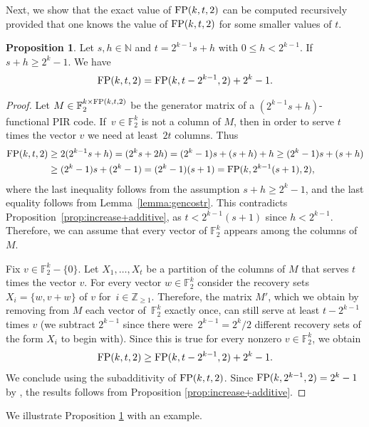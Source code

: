 \documentclass[11pt,a4paper]{article}
\theoremstyle{definition}
\newtheorem{proposition}[theorem]{Proposition}
\newcommand{\N}{\mathbb N}
\newcommand{\Z}{\mathbb Z}
\newcommand{\F}{\mathbb F}
\newcommand{\fp}{\textnormal{FP}}
\begin{document}
Next, we show that the exact value of $\fp(k,t,2)$ can be computed recursively provided that one knows the value of $\fp(k,t,2)$ for some smaller values of $t$.

\begin{proposition}
\label{prop:recursion}
Let $s,h \in \N$ and $t=2^{k-1}s+h$ with $0\leq h< 2^{k-1}$. If $s+h\geq 2^{k}-1$. We have
\begin{equation*}
    \fp(k,t,2)= \fp(k,t-2^{k-1},2)+2^k-1. 
\end{equation*}
\end{proposition}
\begin{proof}
Let $M\in\F_2^{k\times\fp(k,t,2)}$ be the generator matrix of a $(2^{k-1}s+h)$-functional PIR code. If~$v\in\F_2^k$ is not a column of $M$, then in order to serve $t$ times the vector $v$ we  need at least~$2t$ columns. Thus
\begin{align*}
    \fp(k,t,2)&\geq 2(2^{k-1}s+h)= (2^ks+2h)=(2^k-1)s+(s+h) + h \geq (2^k-1)s+(s+h) \\
    &\ge (2^k-1)s+(2^k-1) = (2^k-1)(s+1) =
   \fp(k,2^{k-1}(s+1),2),
\end{align*}
where the last inequality follows from the assumption $s+h\geq 2^{k}-1$, and the last equality follows from Lemma~\ref{lemma:gencostr}. This contradicts Proposition~\ref{prop:increase+additive}, as $t<2^{k-1}(s+1)$ since $h<2^{k-1}$. Therefore, we can assume that every vector of $\F_2^k$ appears among the columns of $M$. 

Fix $v\in\F_2^k - \{0\}$. Let $X_1,\dots,X_t$ be a partition of the columns of $M$ that serves $t$ times the vector $v$. For every vector $w\in\F_2^k$ consider the recovery sets $X_i=\{w,v+w\}$ of $v$ for~$i \in \Z_{\ge 1}.$ Therefore, the matrix $M'$, which we obtain by removing from $M$ each vector of~$\F_2^k$ exactly once,  can still serve at least $t-2^{k-1}$ times $v$ (we subtract $2^{k-1}$ since there were~$2^{k-1} = 2^k/2$ different recovery sets of the form $X_i$ to begin with). Since this is true for every nonzero $v\in\F_2^k$, we obtain
\begin{equation*}
    \fp(k,t,2)\geq\fp(k,t-2^{k-1},2)+2^k-1.
\end{equation*}
We conclude using the subadditivity of $\fp(k,t,2)$. Since $\fp(k,2^{k-1},2)=2^k-1$ by \cite[Theorem 7]{zhang2020bounds}, the results follows from Proposition \ref{prop:increase+additive}.
\end{proof}

We illustrate Proposition \ref{prop:recursion} with an example.
\end{document}
